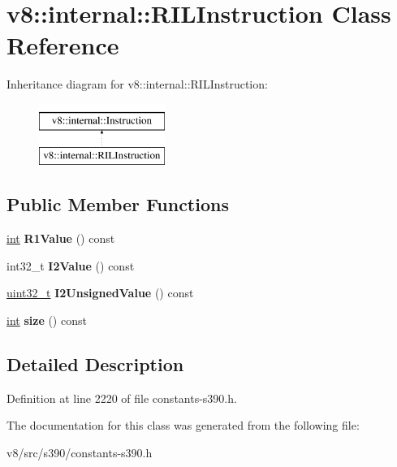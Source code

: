 \hypertarget{classv8_1_1internal_1_1RILInstruction}{}\section{v8\+:\+:internal\+:\+:R\+I\+L\+Instruction Class Reference}
\label{classv8_1_1internal_1_1RILInstruction}
Inheritance diagram for v8\+:\+:internal\+:\+:R\+I\+L\+Instruction\+:\begin{figure}[H]
\begin{center}
\leavevmode
\includegraphics[height=2.000000cm]{classv8_1_1internal_1_1RILInstruction}
\end{center}
\end{figure}
\subsection*{Public Member Functions}
\begin{DoxyCompactItemize}
\item 
\mbox{\label{classv8_1_1internal_1_1RILInstruction_a63dc596d0a70b79f48e233dbfe407146}} 
\mbox{\hyperlink{classint}{int}} {\bfseries R1\+Value} () const
\item 
\mbox{\label{classv8_1_1internal_1_1RILInstruction_a70e00d9a9e5a8cdd1d0238e844970a92}} 
int32\+\_\+t {\bfseries I2\+Value} () const
\item 
\mbox{\label{classv8_1_1internal_1_1RILInstruction_ad76a4c100653426e67718dc788fe4498}} 
\mbox{\hyperlink{classuint32__t}{uint32\+\_\+t}} {\bfseries I2\+Unsigned\+Value} () const
\item 
\mbox{\label{classv8_1_1internal_1_1RILInstruction_a7192b13d7eb1659f1c6cd6108936f882}} 
\mbox{\hyperlink{classint}{int}} {\bfseries size} () const
\end{DoxyCompactItemize}


\subsection{Detailed Description}


Definition at line 2220 of file constants-\/s390.\+h.



The documentation for this class was generated from the following file\+:\begin{DoxyCompactItemize}
\item 
v8/src/s390/constants-\/s390.\+h\end{DoxyCompactItemize}
